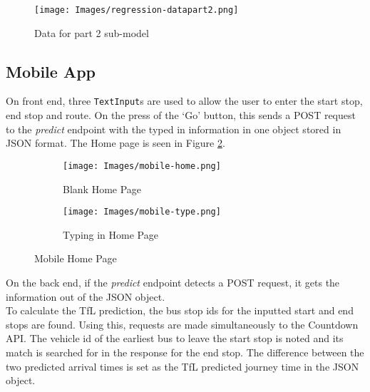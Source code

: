 \begin{figure}[H]
\begin{center}
    \texttt{[image: Images/regression-datapart2.png]}
    \caption{Data for part 2 sub-model}
    \label{fig:regression-part2}
\end{center}
\end{figure}

\subsection{Mobile App}

On front end, three \texttt{TextInput}s are used to allow the user to enter the start stop, end stop and route. On the press of the `Go' button, this sends a POST request to the \textit{predict} endpoint with the typed in information in one object stored in JSON format. The Home page is seen in Figure \ref{fig:mobile-home}.

\begin{figure} [H]
    \centering
    \begin{subfigure}{.5\textwidth}
      \centering
      \texttt{[image: Images/mobile-home.png]}
      \caption{Blank Home Page}
    \end{subfigure}%
    \begin{subfigure}{.5\textwidth}
      \centering
      \texttt{[image: Images/mobile-type.png]}
      \caption{Typing in Home Page}
    \end{subfigure}
    \caption{Mobile Home Page}
    \label{fig:mobile-home}
\end{figure}

On the back end, if the \textit{predict} endpoint detects a POST request, it gets the information out of the JSON object. \\

To calculate the TfL prediction, the bus stop ids for the inputted start and end stops are found. Using this, requests are made simultaneously to the Countdown API. The vehicle id of the earliest bus to leave the start stop is noted and its match is searched for in the response for the end stop. The difference between the two predicted arrival times is set as the TfL predicted journey time in the JSON object. \\


